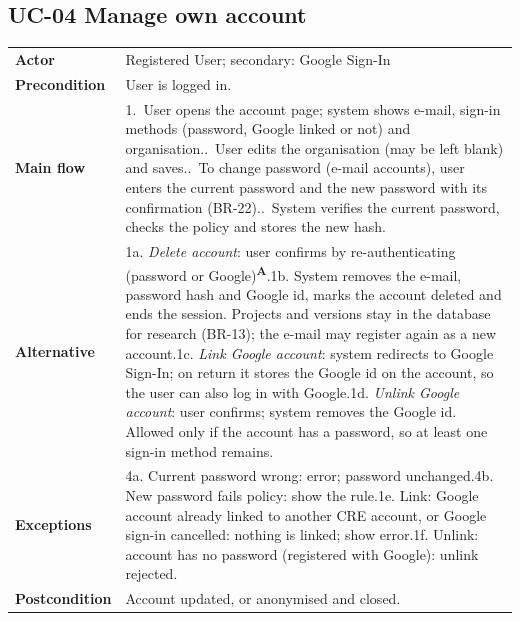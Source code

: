 \documentclass[11pt,a4paper]{article}
\newcommand{\assume}{\textsuperscript{\textcolor{orange!80!black}{\textbf{A}}}}
\begin{document}
\noindent\begin{minipage}{\linewidth}
\subsection*{UC-04 Manage own account}
\begin{tabularx}{\linewidth}{@{}>{\raggedright\leavevmode\bfseries\color{creBlue}}p{2.6cm} Y@{}}
\toprule
Actor & Registered User; secondary: Google Sign-In \\
Precondition & User is logged in. \\
Main flow & 1.~User opens the account page; system shows e-mail, sign-in methods (password, Google linked or not) and organisation..~User edits the organisation (may be left blank) and saves..~To change password (e-mail accounts), user enters the current password and the new password with its confirmation (BR-22)..~System verifies the current password, checks the policy and stores the new hash. \\
Alternative & 1a. \emph{Delete account}: user confirms by re-authenticating (password or Google)\assume{}.\newline 1b. System removes the e-mail, password hash and Google id, marks the account deleted and ends the session. Projects and versions stay in the database for research (BR-13); the e-mail may register again as a new account.\newline 1c. \emph{Link Google account}: system redirects to Google Sign-In; on return it stores the Google id on the account, so the user can also log in with Google.\newline 1d. \emph{Unlink Google account}: user confirms; system removes the Google id. Allowed only if the account has a password, so at least one sign-in method remains. \\
Exceptions & 4a. Current password wrong: error; password unchanged.\newline 4b. New password fails policy: show the rule.\newline 1e. Link: Google account already linked to another CRE account, or Google sign-in cancelled: nothing is linked; show error.\newline 1f. Unlink: account has no password (registered with Google): unlink rejected. \\
Postcondition & Account updated, or anonymised and closed. \\
\bottomrule
\end{tabularx}
\end{minipage}
\par\medskip
\end{document}
